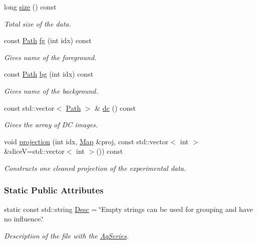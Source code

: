\begin{DoxyCompactItemize}
long \hyperlink{classAqSeries_a44e3311dd785ab0da95a71de03d2043e}{size} () const 
\begin{DoxyCompactList}\small\item\em Total size of the data. \item\end{DoxyCompactList}\item 
const \hyperlink{classPath}{Path} \hyperlink{classAqSeries_a84c9426ecd9473326b1919c9457dd90f}{fg} (int idx) const 
\begin{DoxyCompactList}\small\item\em Gives name of the foreground. \item\end{DoxyCompactList}\item 
const \hyperlink{classPath}{Path} \hyperlink{classAqSeries_ad6183731ce1943f0961a015975d6afd2}{bg} (int idx) const 
\begin{DoxyCompactList}\small\item\em Gives name of the background. \item\end{DoxyCompactList}\item 
const std::vector$<$ \hyperlink{classPath}{Path} $>$ \& \hyperlink{classAqSeries_ad746e7be2b5a0e32d7fdf717742d1461}{dc} () const 
\begin{DoxyCompactList}\small\item\em Gives the array of DC images. \item\end{DoxyCompactList}\item 
void \hyperlink{classAqSeries_aa73a2ccdc171bfe1d76a1d85b1a200ff}{projection} (int idx, \hyperlink{group__Types_ga8747378c016fc11d9ecbb98787248c25}{Map} \&proj, const std::vector$<$ int $>$ \&sliceV=std::vector$<$ int $>$()) const 
\begin{DoxyCompactList}\small\item\em Constructs one cleaned projection of the experimental data. \item\end{DoxyCompactList}\end{DoxyCompactItemize}
\subsubsection*{Static Public Attributes}
\begin{DoxyCompactItemize}
\item 
static const std::string \hyperlink{classAqSeries_ad5432c721e2811d0c8171401e8d0c9aa}{Desc} = \char`\"{}Empty strings can be used for grouping and have no influence.\char`\"{}
\begin{DoxyCompactList}\small\item\em Description of the file with the \hyperlink{classAqSeries}{AqSeries}. \item\end{DoxyCompactList}\end{DoxyCompactItemize}
